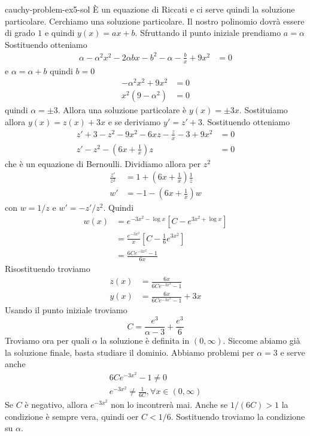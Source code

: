 \documentclass[preview]{standalone}
\begin{document}
\begin{snippetsolution}{cauchy-problem-ex5-sol}{}
    È un equazione di Riccati e ci serve quindi la soluzione particolare.
    Cerchiamo una soluzione particolare. Il nostro polinomio dovrà essere di grado \(1\)
    e quindi \(y(x) = ax +b\).
    Sfruttando il punto iniziale prendiamo \(a = \alpha\)
    Sostituendo otteniamo
    \begin{align*}
        \alpha - \alpha^2x^2 - 2\alpha bx - b^2 - \alpha - \frac{b}{x} + 9x^2 &= 0
    \end{align*}
    e \(\alpha = \alpha + b\) quindi \(b = 0\)
    \begin{align*}
        -\alpha^2 x^2 + 9x^2 &= 0 \\
        x^2(9-\alpha^2) &= 0
    \end{align*}
    quindi \(\alpha = \pm 3\).
    Allora una soluzione particolare è \(y(x) = \pm 3x\).
    Sostituiamo allora \(y(x) = z(x) + 3x\) e se deriviamo
    \(y' = z' + 3\). Sostituendo otteniamo
    \begin{align*}
        z' + 3 - z^2 - 9x^2 - 6xz - \frac{z}{x} - 3 + 9x^2 &= 0 \\
        z' - z^2 - \left(6x + \frac{1}{x}\right)z &= 0
    \end{align*}
    che è un equazione di Bernoulli. Dividiamo allora per \(z^2\)
    \begin{align*}
        \frac{z'}{z^2} &= 1 + \left(6x + \frac{1}{x}\right) \frac{1}{z} \\
        w' &= -1-\left(6x + \frac{1}{x}\right) w
    \end{align*}
    con \(w = 1/z\) e \(w' = -z'/z^2\).
    Quindi
    \begin{align*}
        w(x) &= e^{-3x^2 - \log x} \left[
            C - e^{3x^2 + \log x}
        \right] \\
        &= \frac{e^{-3x^2}}{x}\left[
            C - \frac{1}{6}e^{3x^2}
        \right] \\
        &= \frac{6Ce^{-3x^2} - 1}{6x}
    \end{align*}
    Risostituendo troviamo
    \begin{align*}
        z(x) &= \frac{6x}{6Ce^{-3x^2} - 1} \\
        y(x) &= \frac{6x}{6Ce^{-3x^2}-1} + 3x
    \end{align*}
    Usando il punto iniziale troviamo
    \[
        C = \frac{e^3}{\alpha - 3} + \frac{e^3}{6}
    \]
    Troviamo ora per quali \(\alpha\) la soluzione è definita in \((0, \infty)\).
    Siccome abiamo già la soluzione finale, basta studiare il dominio.
    Abbiamo problemi per \(\alpha = 3\) e serve anche
    \begin{align*}
        6Ce^{-3x^2} - 1 \neq 0 \\
        e^{-3x^2} \neq \frac{1}{6C}, \forall x \in (0,\infty)
    \end{align*}
    Se \(C\) è negativo, allora \(e^{-3x^2}\) non lo incontrerà mai.
    Anche se \(1/(6C) > 1\) la condizione è sempre vera, quindi oer \(C < 1/6\).
    Sostituendo troviamo la condizione su \(\alpha\).
\end{snippetsolution}
\end{document}
